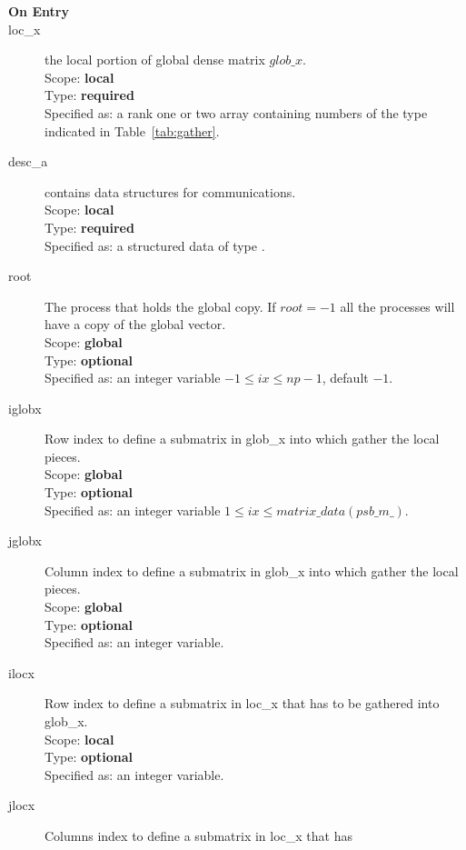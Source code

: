 
\begin{description}
\item[\bf On Entry]
\item[loc\_x] the local portion of global dense matrix
$glob\_x$. \\
Scope: {\bf local} \\
Type: {\bf required}\\
Specified as: a rank one or two array containing numbers of the type
indicated in Table~\ref{tab:gather}.
\item[desc\_a] contains data structures for communications.\\
Scope: {\bf local} \\
Type: {\bf required}\\
Specified as: a structured data of type \descdata.
\item[root]  The process that holds the global copy. If $root=-1$ all
  the processes will have a copy of the global vector.\\
Scope: {\bf global} \\
Type: {\bf optional}\\
Specified as: an integer variable $-1\le ix\le np-1$, default $-1$. 
\item[iglobx]  Row index to define a submatrix in glob\_x into which
  gather the local pieces.\\
Scope: {\bf global} \\
Type: {\bf optional}\\
Specified as: an integer variable $1\le ix\le matrix\_data(psb\_m\_)$. 
\item[jglobx]  Column index to define a submatrix in glob\_x into which
  gather the local pieces.\\
Scope: {\bf global} \\
Type: {\bf optional}\\
Specified as: an integer variable. 
\item[ilocx]  Row index to define a submatrix in loc\_x that has to
  be gathered into glob\_x.\\
Scope: {\bf local} \\
Type: {\bf optional}\\
Specified as: an integer variable. 
\item[jlocx]  Columns index to define a submatrix in loc\_x that has

\end{description}
